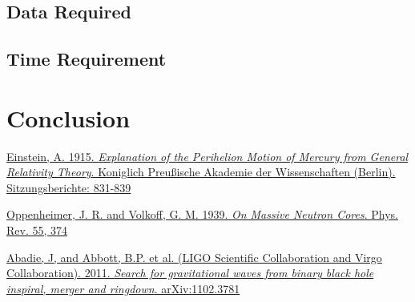 \documentclass[paper=letterpaper, fontsize=11pt]{scrartcl}
\numberwithin{equation}{section}		%
\numberwithin{figure}{section}			%
\numberwithin{table}{section}			%
\begin{document}


\subsection{Data Required}

\subsection{Time Requirement}



\section{Conclusion}



\begin{thebibliography}{99}

 	\href{http://www.gsjournal.net/old/eeuro/vankov.pdf}{Einstein, A. 1915. \emph{Explanation of the
	Perihelion Motion of Mercury from General Relativity Theory}. Koniglich Preußische Akademie der Wissenschaften (Berlin). Sitzungsberichte: 831-839}
	
	\href{http://journals.aps.org/pr/abstract/10.1103/PhysRev.55.374}{Oppenheimer, J. R. and Volkoff, G. M. 1939. \emph{On Massive Neutron Cores}. Phys. Rev. 55, 374}
	
	\href{https://arxiv.org/pdf/1102.3781v1.pdf}{Abadie, J, and Abbott, B.P. et al. (LIGO Scientific Collaboration and Virgo 	Collaboration). 2011. \emph{Search for gravitational waves from binary black hole inspiral, merger and ringdown}.  		arXiv:1102.3781}

\end{thebibliography}

\end{document}
